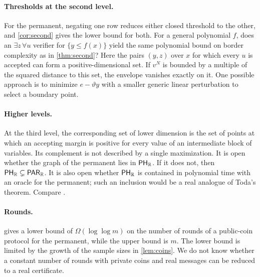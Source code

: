 \paragraph{Thresholds at the second level.} For the permanent, negating one row reduces either closed threshold to the other, and \cref{cor:second} gives the lower bound for both. For a general polynomial $f$, does an $\exists z\,\forall u$ verifier for $\{y\le f(x)\}$ yield the same polynomial bound on border complexity as in \cref{thm:second}? Here the pairs $(y,z)$ over $x$ for which every $u$ is accepted can form a positive-dimensional set. If $v^N$ is bounded by a multiple of the squared distance to this set, the envelope vanishes exactly on it. One possible approach is to minimize $e-\vartheta y$ with a smaller generic linear perturbation to select a boundary point.

\paragraph{Higher levels.} At the third level, the corresponding set of lower dimension is the set of points at which an accepting margin is positive for every value of an intermediate block of variables. Its complement is not described by a single maximization. It is open whether the graph of the permanent lies in $\textsf{\upshape PH}_{\mathbb{R}}$. If it does not, then $\textsf{\upshape PH}_{\mathbb{R}}\subsetneq\textsf{\upshape PAR}_{\mathbb{R}}$. It is also open whether $\textsf{\upshape PH}_{\mathbb{R}}$ is contained in polynomial time with an oracle for the permanent; such an inclusion would be a real analogue of Toda's theorem. Compare \cite{BM16,Bur26}.

\paragraph{Rounds.}  gives a lower bound of $\Omega(\log\log m)$ on the number of rounds of a public-coin protocol for the permanent, while the upper bound is $m$. The lower bound is limited by the growth of the sample sizes in \cref{lem:coins}. We do not know whether a constant number of rounds with private coins and real messages can be reduced to a real certificate.
